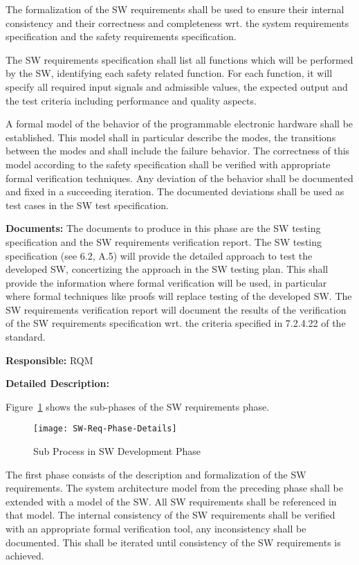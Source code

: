 The formalization of the SW requirements shall be used to ensure their internal
consistency and their correctness and completeness wrt. the system requirements
specification and the safety requirements specification.

The SW requirements specification shall list all functions which will be
performed by the SW, identifying each safety related function. For each
function, it will specify all required input signals and admissible values, the
expected output and the test criteria including performance and quality aspects.

A formal model of the behavior of the programmable electronic hardware shall be
established. This model shall in particular describe the modes, the transitions
between the modes and shall include the failure behavior. The correctness of
this model according to the safety specification shall be verified with
appropriate formal verification techniques. Any deviation of the behavior shall
be documented and fixed in a succeeding iteration. The documented deviations
shall be used as test cases in the SW test specification.

{\bf Documents:} The documents to produce in this phase are the SW testing
specification and the SW requirements verification report. The SW testing
specification (see 6.2, A.5) will provide the detailed approach to test the
developed SW, concertizing the approach in the SW testing plan. This shall
provide the information where formal verification will be used, in particular
where formal techniques like proofs will replace testing of the developed SW.
The SW requirements verification report will document the results of the
verification of the SW requirements specification wrt. the criteria specified in
7.2.4.22 of the standard.

{\bf Responsible:} RQM

{\bf Detailed Description:}

Figure~\ref{fig:detailed-sw-dev-phase} shows the sub-phases of the SW
requirements phase.

\begin{figure}[ht]
  \centering
  \texttt{[image: SW-Req-Phase-Details]}
  \caption{Sub Process in SW Development Phase}
  \label{fig:detailed-sw-dev-phase}
\end{figure}

The first phase consists of the description and formalization of the SW
requirements. The system architecture model from the preceding phase shall be
extended with a model of the SW. All SW requirements shall be referenced in that
model. The internal consistency of the SW requirements shall be verified with an
appropriate formal verification tool, any inconsistency shall be
documented. This shall be iterated until consistency of the SW requirements is
achieved.

